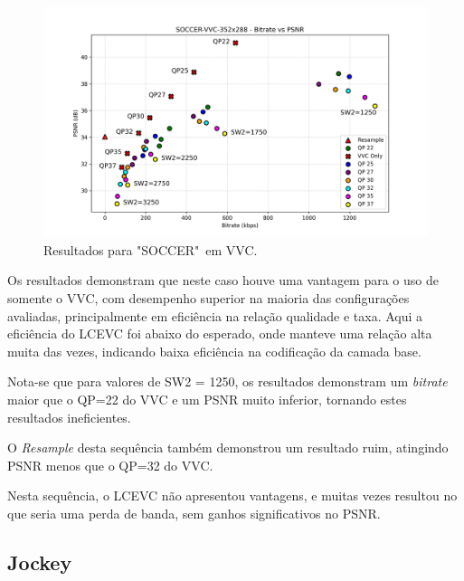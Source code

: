 \begin{figure}[h]
    \centering
    \includegraphics[width=1.0\textwidth]{img/SOCCER-VVC.png}
    \caption{Resultados para "SOCCER"\ em \acrshort{VVC}. \cite{xiph}}
    \label{fig:Soccer-VVC}
\end{figure}

Os resultados demonstram que neste caso houve uma vantagem para o uso de
somente o \acrshort{VVC}, com desempenho superior na maioria das configurações
avaliadas, principalmente em eficiência na relação qualidade e taxa.
Aqui a eficiência do \acrshort{LCEVC} foi abaixo do esperado, onde manteve
uma relação alta muita das vezes, indicando baixa eficiência na codificação
da camada base.

Nota-se que para valores de SW2 = 1250, os resultados demonstram um \textit{bitrate}
maior que o QP=22 do \acrshort{VVC} e um \acrshort{PSNR} muito inferior, tornando
estes resultados ineficientes.

O \textit{Resample} desta sequência também demonstrou um resultado ruim, atingindo
\acrshort{PSNR} menos que o QP=32 do \acrshort{VVC}.

Nesta sequência, o \acrshort{LCEVC} não apresentou vantagens, e muitas vezes
resultou no que seria uma perda de banda, sem ganhos significativos no
\acrshort{PSNR}.

\newpage
\subsection{Jockey}

